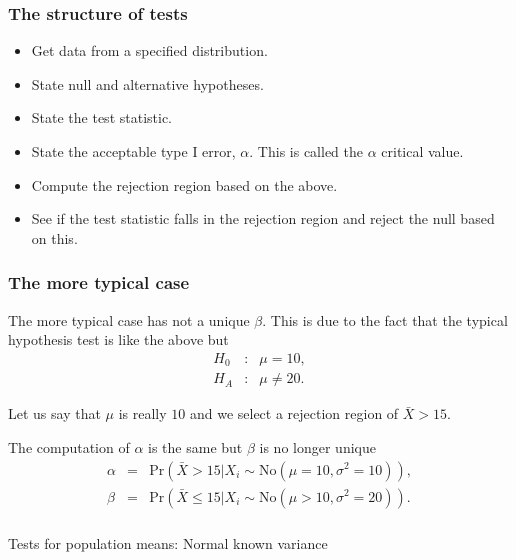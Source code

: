 \begin{frame}[fragile]\frametitle{The structure of tests}

\begin{itemize}

\item Get data from a specified distribution.

\item State null and alternative hypotheses.

\item State the test statistic.

\item State the acceptable type I error, $\alpha$. This
is called the $\alpha$ critical value.

\item Compute the rejection region based on the above.

\item See if the test statistic falls in the rejection
region and reject the null based on this.

\end{itemize}

\end{frame}

\begin{frame}[fragile]\frametitle{The more typical case}

{\tiny

The more typical case has not a unique $\beta$. This is due
to the fact that the typical hypothesis test is like the above
but 
\begin{eqnarray*}
H_0&:& \mu= 10, \\
H_A&:& \mu\neq 20.
\end{eqnarray*}

Let us say that $\mu$ is really $10$ and we select a rejection
region of $\bar{X} > 15$.

The computation of $\alpha$ is the same but $\beta$ is no longer unique
\begin{eqnarray*}
\alpha &= &\mbox{Pr}(\bar{X} > 15 | X_i \sim \mbox{No}(\mu=10,\sigma^2=10)), \\
\beta &= &\mbox{Pr}(\bar{X} \leq 15 | X_i \sim \mbox{No}(\mu > 10,\sigma^2=20)).
\end{eqnarray*}


}
\end{frame}

\begin{frame}[fragile]\frametitle{}
\begin{center}
{\Large Tests for population means: Normal known variance}

\end{center}
\end{frame}




